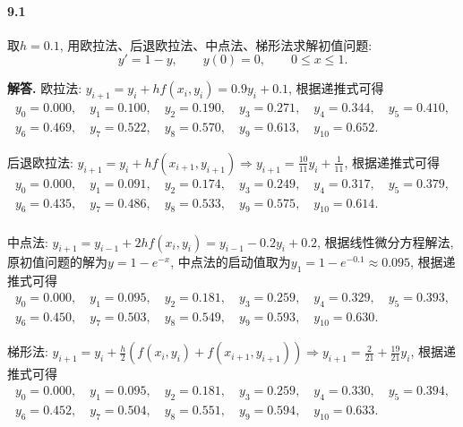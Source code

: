 \documentclass[12pt, a4paper, oneside]{ctexart}
\newenvironment{solution}{\par\noindent\textbf{解答. }}{\bigskip\par}
\let\leq=\leqslant %
\def\del{\vspace{-3.5ex}}  %
\begin{document}
\paragraph{9.1}取$h=0.1$, 用欧拉法、后退欧拉法、中点法、梯形法求解初值问题:
\begin{equation*}
    y' = 1-y,\qquad y(0) = 0,\qquad 0\leq x\leq 1.
\end{equation*}
\begin{solution}
     欧拉法: $y_{i+1} = y_i+hf(x_i, y_i) = 0.9y_i+0.1$, 根据递推式可得
     \begin{equation*}
     \begin{array}{l}
        y_0 = 0.000,\quad y_1 = 0.100,\quad y_2 = 0.190,\quad y_3 = 0.271,\quad y_4 = 0.344,\quad y_5 = 0.410,\\
        y_6 = 0.469, \quad y_7 = 0.522, \quad y_8 = 0.570,\quad y_9 = 0.613,\quad y_{10} = 0.652.
     \end{array}
     \end{equation*}

     后退欧拉法: $y_{i+1} = y_i  +hf(x_{i+1}, y_{i+1})\Rightarrow y_{i+1} = \frac{10}{11}y_i+\frac{1}{11}$, 根据递推式可得
     \begin{equation*}
     \begin{array}{l}
        y_0 = 0.000,\quad y_1 = 0.091,\quad y_2 = 0.174,\quad y_3 = 0.249,\quad y_4 = 0.317,\quad y_5 = 0.379,\\
        y_6 = 0.435,\quad y_7 = 0.486,\quad y_8 = 0.533,\quad y_9 = 0.575,\quad y_{10} = 0.614.\\
     \end{array}
     \end{equation*}

     中点法: $y_{i+1} = y_{i-1}+2hf(x_i,y_i) = y_{i-1}-0.2y_i+0.2$, 根据线性微分方程解法, 原初值问题的解为$y = 1-e^{-x}$, 中点法的启动值取为$y_1 = 1-e^{-0.1}\approx 0.095$, 根据递推式可得
     \begin{equation*}
     \begin{array}{l}
         y_0 = 0.000,\quad y_1 = 0.095,\quad y_2 = 0.181,\quad y_3 = 0.259,\quad y_4 = 0.329,\quad y_5 = 0.393,\\
        y_6 = 0.450,\quad y_7 = 0.503,\quad y_8 = 0.549,\quad y_9 = 0.593,\quad y_{10} = 0.630.
     \end{array}
     \end{equation*}
     
     梯形法: $y_{i+1} = y_i+\frac{h}{2}(f(x_i,y_i)+f(x_{i+1},y_{i+1}))\Rightarrow y_{i+1}=\frac{2}{21}+\frac{19}{21}y_i$, 根据递推式可得
     \begin{equation*}
         \begin{array}{l}
            y_{0} = 0.000,\quad y_{1} = 0.095,\quad y_{2} = 0.181,\quad y_{3} = 0.259,\quad y_{4} = 0.330,\quad y_{5} = 0.394,\\
            y_{6} = 0.452,\quad y_{7} = 0.504,\quad y_{8} = 0.551,\quad y_{9} = 0.594,\quad y_{10} = 0.633.
         \end{array}
     \end{equation*}
\end{solution}\del
\end{document}
